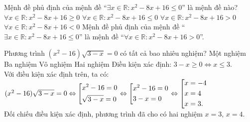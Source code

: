 \begin{ex}%
 Mệnh đề phủ định của mệnh đề ``$\exists x \in \mathbb{R}: x^2 - 8x + 16 \leq 0$'' là mệnh đề nào?
 \choice
  {$\forall x \in \mathbb{R}: x^2 - 8x + 16 \geq 0$}
  {$\forall x \in \mathbb{R}: x^2 - 8x + 16 \leq 0$}
  {\True $\forall x \in \mathbb{R}: x^2 - 8x + 16 > 0$}
  {$\forall x \in \mathbb{R}: x^2 - 8x + 16 < 0$}
 \loigiai
 {
 Mệnh đề phủ định của mệnh đề ``$\exists x \in \mathbb{R}: x^2 - 8x + 16 \leq 0$'' là mệnh đề ``$\forall x \in \mathbb{R}: x^2 - 8x + 16 > 0$''.
 }
\end{ex}


\begin{ex}%
 Phương trình $(x^2 - 16)\sqrt{3-x} = 0$ có tất cả bao nhiêu nghiệm?
 \choice
  {Một nghiệm}
  {Ba nghiệm}
  {Vô nghiệm}
  {\True Hai nghiệm}
 \loigiai
 {
 Điều kiện xác định: $3 - x \geq 0 \Leftrightarrow x \leq 3$.\\
 Với điều kiện xác định trên, ta có:\\
 $(x^2 - 16)\sqrt{3-x} = 0 \Leftrightarrow \left[\begin{aligned}& x^2 - 16 = 0 \\& \sqrt{3-x} = 0\end{aligned}\right. \Leftrightarrow \left[\begin{aligned}& x^2 - 16 = 0\\& 3 - x = 0\end{aligned}\right. \Leftrightarrow \left[\begin{aligned}& x = -4 \\& x = 4 \\& x = 3.\end{aligned}\right.$\\
 Đối chiếu điều kiện xác định, phương trình đã cho có hai nghiệm $x = 3$, $x = 4$.
 }
\end{ex}


